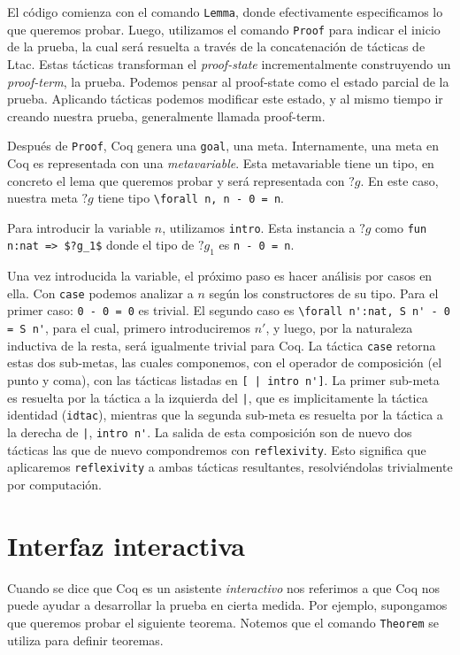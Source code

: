 El código comienza con el comando \lstinline{Lemma}, donde efectivamente especificamos lo que queremos probar.
Luego, utilizamos el comando \lstinline{Proof} para indicar el inicio de la prueba, la cual será resuelta a través de la concatenación de tácticas de Ltac. Estas tácticas transforman el \textit{proof-state} incrementalmente construyendo un \textit{proof-term}, la prueba. Podemos pensar al proof-state como el estado parcial de la prueba. Aplicando tácticas podemos modificar este estado, y al mismo tiempo ir creando nuestra prueba, generalmente llamada proof-term.

Después de \lstinline{Proof}, Coq genera una \lstinline{goal}, una meta. Internamente, una meta en Coq es representada con una \textit{metavariable}. Esta metavariable tiene un tipo, en concreto el lema que queremos probar y será representada con $?g$. En este caso, nuestra meta $?g$ tiene tipo \lstinline{\forall n, n - 0 = n}.

Para introducir la variable $n$, utilizamos \lstinline{intro}. Esta instancia a $?g$ como \lstinline{fun n:nat => $?g_1$} donde el tipo de $?g_1$ es \lstinline{n - 0 = n}.

Una vez introducida la variable, el próximo paso es hacer análisis por casos en ella. Con \lstinline{case} podemos analizar a $n$ según los constructores de su tipo. Para el primer caso: \lstinline{0 - 0 = 0} es trivial. El segundo caso es \lstinline{\forall n':nat, S n' - 0 = S n'}, para el cual, primero introduciremos $n'$, y luego, por la naturaleza inductiva de la resta, será igualmente trivial para Coq. La táctica \lstinline{case} retorna estas dos sub-metas, las cuales componemos, con el operador de composición (el punto y coma), con las tácticas listadas en \lstinline{[ | intro n']}. La primer sub-meta es resuelta por la táctica a la izquierda del \lstinline{|}, que es implicitamente la táctica identidad (\lstinline{idtac}), mientras que la segunda sub-meta es resuelta por la táctica a la derecha de \lstinline{|}, \lstinline{intro n'}. La salida de esta composición son de nuevo dos tácticas las que de nuevo compondremos con \lstinline{reflexivity}. Esto significa que aplicaremos \lstinline{reflexivity} a ambas tácticas resultantes, resolviéndolas trivialmente por computación.

\section{Interfaz interactiva}

Cuando se dice que Coq es un asistente \textit{interactivo} nos referimos a que Coq nos puede ayudar a desarrollar la prueba en cierta medida.
Por ejemplo, supongamos que queremos probar el siguiente teorema.
Notemos que el comando \lstinline{Theorem} se utiliza para definir teoremas.

